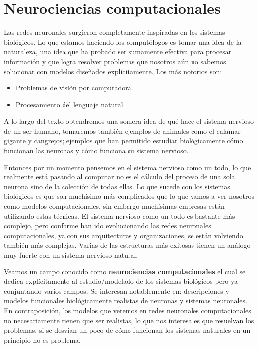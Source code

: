\section{Neurociencias computacionales}

Las redes neuronales surgieron completamente inspiradas en los sistemas biológicos. 
Lo que estamos haciendo los computólogos es tomar una idea de la naturaleza, una idea que ha probado ser sumamente efectiva para procesar información y que logra resolver problemas que nosotros aún no sabemos solucionar con modelos diseñados explícitamente.
Los más notorios son: 
\begin{itemize}
\item Problemas de visión por computadora.
\item Procesamiento del lenguaje natural.
\end{itemize}

A lo largo del texto obtendremos una somera idea de qué hace el sistema nervioso de un ser humano, tomaremos también ejemplos de animales como el calamar gigante y cangrejos; ejemplos que han permitido estudiar biológicamente cómo funcionan las neuronas y cómo funciona su sistema nervioso. 

Entonces por un momento pensemos en el sistema nervioso como un todo, lo que realmente está pasando al computar no es el cálculo del proceso  de una sola neurona sino de la colección de todas ellas. Lo que sucede con los sistemas biológicos es que son muchísimo más complicados que lo que vamos a ver nosotros como modelos computacionales, sin embargo muchísimas empresas están utilizando estas técnicas. 
El sistema nervioso como un todo es bastante más complejo, pero conforme han ido evolucionando las redes neuronales computacionales, ya con sus arquitecturas y organizaciones, se están volviendo también más complejas. Varias de las estructuras más exitosas tienen un análogo muy fuerte con un sistema nervioso natural. 

Veamos un campo conocido como \textbf{neurociencias computacionales} el cual se dedica explícitamente al estudio/modelado de los sistemas biológicos pero ya conjuntando varios campos. Se interesan notablemente en:  descripciones y modelos funcionales biológicamente realistas de neuronas y sistemas neuronales. En contraposición, los modelos que veremos en redes neuronales computacionales no necesariamente tienen que ser realistas, lo que nos interesa es que resuelvan los problemas, si se desvían un poco de cómo funcionan los sistemas naturales en un principio no es problema. 

